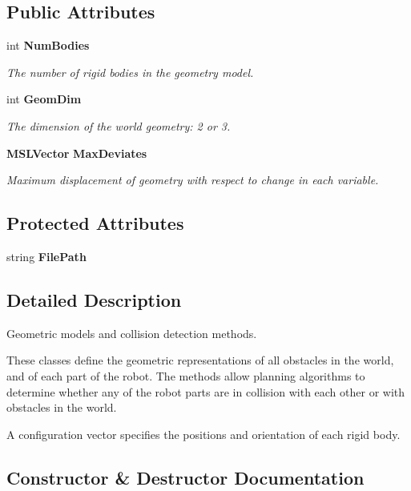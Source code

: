 \subsection*{Public Attributes}
\begin{CompactItemize}
\item 
int {\bf Num\-Bodies}
\begin{CompactList}\small\item\em The number of rigid bodies in the geometry model.\item\end{CompactList}\item 
int {\bf Geom\-Dim}
\begin{CompactList}\small\item\em The dimension of the world geometry: 2 or 3.\item\end{CompactList}\item 
{\bf MSLVector} {\bf Max\-Deviates}
\begin{CompactList}\small\item\em Maximum displacement of geometry with respect to change in each variable.\item\end{CompactList}\end{CompactItemize}
\subsection*{Protected Attributes}
\begin{CompactItemize}
\item 
string {\bf File\-Path}
\end{CompactItemize}


\subsection{Detailed Description}
Geometric models and collision detection methods.

These classes define the geometric representations of all obstacles in the world, and of each part of the robot. The methods allow planning algorithms to determine whether any of the robot parts are in collision with each other or with obstacles in the world.

A configuration vector specifies the positions and orientation of each rigid body. 



\subsection{Constructor \& Destructor Documentation}
